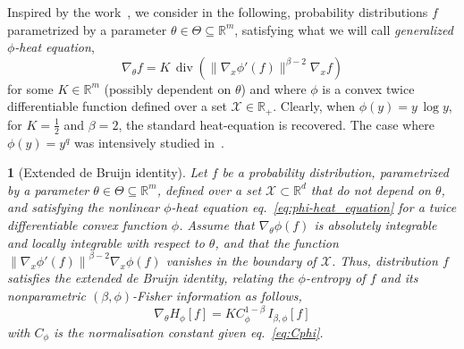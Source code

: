 \documentclass[english,sort&compress]{elsarticle}
\theoremstyle{definition}
\theoremstyle{plain}
\newtheorem{prop}{\protect\propositionname}
\theoremstyle{plain}
\providecommand{\propositionname}{Proposition}
\def\Rset{\mathbb{R}}
\def\X{\mathcal{X}}
\def\div{\operatorname{div}}
\begin{document}
Inspired by the work~\cite{Ber13:08},  we consider in the following, probability
distributions  $f$ parametrized  by  a parameter  $\theta  \in \Theta  \subseteq
\Rset^m$, satisfying what we will call {\em generalized $\phi$-heat equation},
%
\begin{equation}
\label{eq:phi-heat_equation}
\nabla_\theta f = K \, \div\left( \| \nabla_x \phi'(f) \|^{\beta-2}
\nabla_x f \right)
\end{equation}
%
for some $K \in \Rset^m$ (possibly  dependent on $\theta$) and where $\phi$ is a
convex  twice differentiable  function  defined  over a  set  $\X \in  \Rset_+$.
Clearly, when $\phi(y)  = y \, \log y$,  for $K = \frac12$ and $\beta  = 2$, the
standard  heat-equation  is recovered.   The  case  where  $\phi(y) =  y^q$  was
intensively studied in~\cite{Ber13:08}.  

\begin{prop}[Extended de Bruijn identity]\label{prop:phiDeBruijn}
  Let $f$ be a probability distribution, parametrized by a parameter $\theta \in
  \Theta \subseteq \Rset^m$, defined over a set $\X \subset \Rset^d$ that do not
  depend  on  $\theta$,  and   satisfying  the  nonlinear  $\phi$-heat  equation
  eq.~\eqref{eq:phi-heat_equation}  for a  twice differentiable  convex function
  $\phi$.   Assume that  $\nabla_\theta  \phi(f)$ is  absolutely integrable  and
  locally integrable  with respect to  $\theta$, and that the  function $\left\|
    \nabla_x  \phi'(f)  \right\|^{\beta-2}  \nabla_x  \phi(f)$ vanishes  in  the
  boundary of  $\X$.  Thus,  distribution $f$ satisfies  the extended  de Bruijn
  identity,   relating  the   $\phi$-entropy  of   $f$  and   its  nonparametric
  $(\beta,\phi)$-Fisher information as follows,
%
\begin{equation}
\label{eq:phiDeBruijn}
\nabla_\theta H_\phi[f] = K C_\phi^{1-\beta} \, I_{\beta,\phi}[f]
\end{equation}
%
with $C_\phi$ is the normalisation constant given eq.~\eqref{eq:Cphi}. 
\end{prop}
\end{document}
